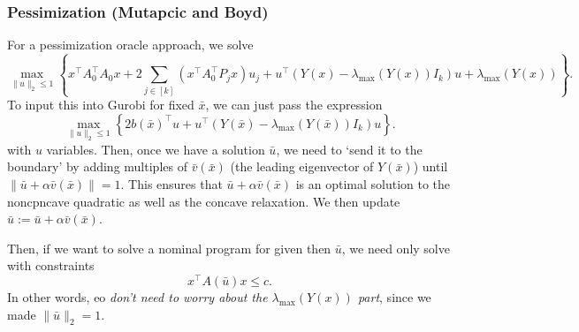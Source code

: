 \documentclass[11pt,oneside]{article}
\theoremstyle{plain}
\theoremstyle{definition}
\theoremstyle{remark}
\begin{document}
\subsubsection{Pessimization (Mutapcic and Boyd)}
For a pessimization oracle approach, we solve
\[\max_{\|u\|_2 \leq 1} \left\{ x^\top A_0^\top A_0 x + 2 \sum_{j \in [k]} (x^\top A_0^\top P_j x) u_j + u^\top (Y(x) - \lambda_{\max}(Y(x)) I_k) u + \lambda_{\max}(Y(x))\right\}.\]
To input this into Gurobi for fixed $\bar{x}$, we can just pass the expression
\[\max_{\|u\|_2 \leq 1} \left\{ 2 b(\bar{x})^\top u + u^\top (Y(\bar{x}) - \lambda_{\max}(Y(\bar{x})) I_k) u \right\}.\]
with $u$ variables. Then, once we have a solution $\bar{u}$, we need to `send it to the boundary' by adding multiples of $\bar{v}(\bar{x})$ (the leading eigenvector of $Y(\bar{x})$) until $\|\bar{u} + \alpha \bar{v}(\bar{x})\|=1$. This ensures that $\bar{u} + \alpha \bar{v}(\bar{x})$ is an optimal solution to the noncpncave quadratic as well as the concave relaxation. We then update $\bar{u} := \bar{u} + \alpha \bar{v}(\bar{x})$.

Then, if we want to solve a nominal program for given then $\bar{u}$, we need only solve with constraints
\[ x^\top A(\bar{u}) x \leq c. \]
In other words, eo \emph{don't need to worry about the $\lambda_{\max}(Y(x))$ part}, since we made $\|\bar{u}\|_2 = 1$.




%
%
\end{document}
